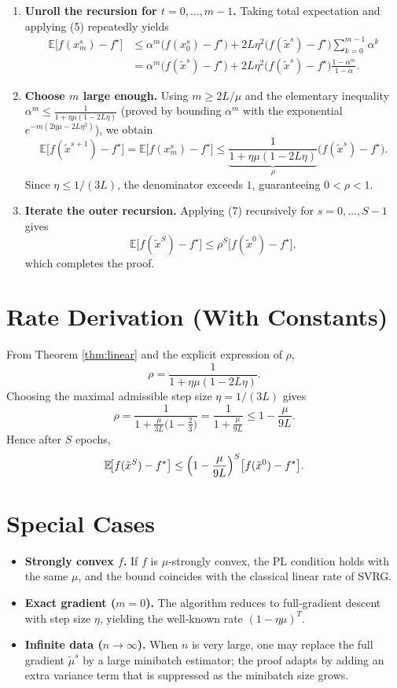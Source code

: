 \documentclass{article}
\newcommand{\E}{\mathbb{E}}
\begin{document}
\begin{enumerate}
\item[Step 7.] \textbf{Unroll the recursion for $t=0,\dots,m-1$.}  
Taking total expectation and applying (5) repeatedly yields
\[
\begin{aligned}
\E\!\bigl[f(x_{m}^{s})-f^{\star}\bigr]
&\le \alpha^{m}\bigl(f(x_{0}^{s})-f^{\star}\bigr)
   +2L\eta^{2}\bigl(f(\tilde{x}^{s})-f^{\star}\bigr)\sum_{k=0}^{m-1}\alpha^{k}\\
&= \alpha^{m}\bigl(f(\tilde{x}^{s})-f^{\star}\bigr)
   +2L\eta^{2}\bigl(f(\tilde{x}^{s})-f^{\star}\bigr)\frac{1-\alpha^{m}}{1-\alpha}.
\end{aligned}
\tag{6}
\]

\item[Step 8.] \textbf{Choose $m$ large enough.}  
Using $m\ge 2L/\mu$ and the elementary inequality $\alpha^{m}\le \frac{1}{1+\eta\mu(1-2L\eta)}$ (proved by bounding $\alpha^{m}$ with the exponential $e^{-m(2\eta\mu-2L\eta^{2})}$), we obtain
\[
\E\!\bigl[f(\tilde{x}^{s+1})-f^{\star}\bigr]
=\E\!\bigl[f(x_{m}^{s})-f^{\star}\bigr]
\le \underbrace{\frac{1}{1+\eta\mu(1-2L\eta)}}_{\displaystyle \rho}
   \bigl(f(\tilde{x}^{s})-f^{\star}\bigr).
\tag{7}
\]
Since $\eta\le 1/(3L)$, the denominator exceeds $1$, guaranteeing $0<\rho<1$.

\item[Step 9.] \textbf{Iterate the outer recursion.}  
Applying (7) recursively for $s=0,\dots,S-1$ gives
\[
\E\!\bigl[f(\tilde{x}^{S})-f^{\star}\bigr]
\le \rho^{S}\bigl[f(\tilde{x}^{0})-f^{\star}\bigr],
\]
which completes the proof. \qedhere
\end{enumerate}

\section*{Rate Derivation (With Constants)}
From Theorem \ref{thm:linear} and the explicit expression of $\rho$,
\[
\rho = \frac{1}{1+\eta\mu(1-2L\eta)}.
\]
Choosing the maximal admissible step size $\eta=1/(3L)$ gives
\[
\rho = \frac{1}{1+\frac{\mu}{3L}\bigl(1-\tfrac{2}{3}\bigr)}
      = \frac{1}{1+\frac{\mu}{9L}}
      \le 1-\frac{\mu}{9L}.
\]
Hence after $S$ epochs,
\[
\E\!\bigl[f(\tilde{x}^{S})-f^{\star}\bigr]
\le \Bigl(1-\frac{\mu}{9L}\Bigr)^{S}\bigl[f(\tilde{x}^{0})-f^{\star}\bigr].
\]

\section*{Special Cases}
\begin{itemize}
\item \textbf{Strongly convex $f$.} If $f$ is $\mu$‑strongly convex, the PL condition holds with the same $\mu$, and the bound coincides with the classical linear rate of SVRG.
\item \textbf{Exact gradient ($m=0$).} The algorithm reduces to full‑gradient descent with step size $\eta$, yielding the well‑known rate $(1-\eta\mu)^{T}$.
\item \textbf{Infinite data ($n\to\infty$).} When $n$ is very large, one may replace the full gradient $\tilde{\mu}^{s}$ by a large minibatch estimator; the proof adapts by adding an extra variance term that is suppressed as the minibatch size grows.
\end{itemize}
\end{document}
